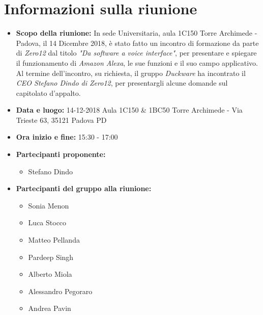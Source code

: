 \clearpage
\section{Informazioni sulla riunione}
\begin{itemize}
	\item \textbf {Scopo della riunione:} In sede Universitaria, aula 1C150 Torre Archimede - Padova, il 14 Dicembre 2018, è stato fatto un incontro di formazione da parte di \emph{Zero12} dal titolo \emph{"Da software a voice interface"}, per presentare e spiegare il funzionamento di \emph{Amazon Alexa}, le sue funzioni e il suo campo applicativo. Al termine dell'incontro, su richiesta, il gruppo \emph{Duckware} ha incontrato il \emph{CEO Stefano Dindo di Zero12}, per presentargli alcune domande sul capitolato d'appalto.
	
	\item \textbf {Data e luogo:} 14-12-2018 Aula 1C150 \& 1BC50 Torre Archimede - Via Trieste 63, 35121 Padova PD
	
	\item \textbf {Ora inizio e fine:} 15:30 - 17:00
	
	\item \textbf {Partecipanti proponente:} 
		\begin{itemize}
			\item Stefano Dindo
		\end{itemize}
	
	\item \textbf {Partecipanti del gruppo alla riunione:} 
		 \begin{itemize}
			\item Sonia Menon
			\item Luca Stocco
			\item Matteo Pellanda
			\item Pardeep Singh
			\item Alberto Miola
			\item Alessandro Pegoraro
			\item Andrea Pavin
		\end{itemize}
\end{itemize}